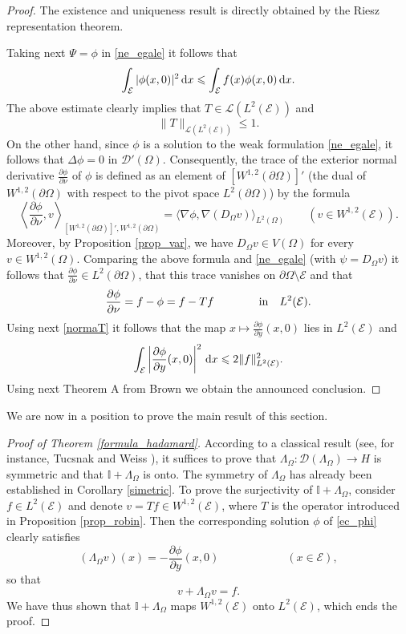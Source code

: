 \documentclass{amsart} %
\numberwithin{equation}{section}
\theoremstyle{definition}
\begin{document}
\begin{proof}
The existence and uniqueness result is directly obtained by the Riesz representation theorem.


Taking next $\Psi=\phi$ in \eqref{ne_egale} it follows that
$$
\int_\mathcal{E} |\phi(x,0)|^2 \, {\rm d} x\leqslant \int_\mathcal{E} f(x) \phi(x,0)\, {\rm d}x. 
$$
The above estimate clearly implies that $T\in \mathcal{L}(L^2(\mathcal{E}))$ and 
\begin{equation}\label{normaT}
\|T\|_{\mathcal{L}(L^2(\mathcal{E}))}\leqslant 1.
\end{equation}
On the other hand, since $\phi$ is a solution to the weak formulation \eqref{ne_egale}, it follows that $\Delta\phi=0$ in
$\mathcal{D}'(\Omega)$. Consequently, the   trace of the exterior normal derivative $\frac{\partial\phi}{\partial\nu}$ of $\phi$ is
defined as an element of $\left[W^{1,2}(\partial\Omega)\right]'$ (the dual of
$W^{1,2}(\partial\Omega)$ with respect to the pivot space $L^2(\partial\Omega)$)
by the formula 
$$
\left\langle \frac{\partial\phi}{\partial\nu},v\right\rangle_{\left[W^{1,2}(\partial\Omega)\right]',W^{1,2}(\partial\Omega)}=
\langle\nabla\phi,\nabla(D_\Omega v)\rangle_{L^2(\Omega)} \qquad(v\in W^{1,2}(\mathcal{E})).
$$
Moreover, by Proposition \ref{prop_var}, we have $D_\Omega v\in V(\Omega)$ for every $v\in W^{1,2}(\Omega)$.
Comparing the above formula and \eqref{ne_egale} (with $\psi=D_\Omega v$) it follows that $\frac{\partial\phi}{\partial\nu}\in L^2(\partial\Omega)$, that this trace vanishes on $\partial\Omega\setminus \mathcal{E}$ and that 
$$
\frac{\partial \phi}{\partial \nu}=f-\phi=f -Tf\qquad\qquad {\rm in}\quad L^2(\mathcal{E}).
$$
Using next \eqref{normaT} it follows that the map $x\mapsto \frac{\partial \phi}{\partial y}(x,0)$ lies in $L^2(\mathcal{E})$ and
$$
\int_\mathcal{E} \left| \frac{\partial \phi}{\partial y}(x,0) \right|^2\, {\rm d}x \leqslant
2\|f\|^2_{L^2(\mathcal{E})}.
$$
Using next Theorem A from Brown \cite{brown1994mixed} we obtain the announced conclusion.
\end{proof}

We are now in a position to prove the main result of this section.

\begin{proof}[Proof of Theorem \ref{formula_hadamard}]
According to a classical result (see, for instance, Tucsnak and Weiss \cite[Proposition 2.3.4]{Obs_book}),
it suffices to prove that $\Lambda_\Omega:\mathcal{D}(\Lambda_\Omega)\to H$ is symmetric and that $\mathbb{I}+\Lambda_\Omega$ is onto.
The symmetry of $\Lambda_\Omega$ has already been established in Corollary \ref{simetric}.
To prove the surjectivity of $\mathbb{I}+\Lambda_\Omega$, consider $f\in L^2(\mathcal{E})$
and denote  $v=Tf\in W^{1,2}(\mathcal{E})$, where $T$ is the operator introduced in Proposition \ref{prop_robin}. 
Then the corresponding solution $\phi$ of \eqref{ec_phi} clearly satisfies
$$
(\Lambda_\Omega v)(x)=-\frac{\partial\phi}{\partial y} (x,0) \qquad\qquad\qquad(x\in \mathcal{E}),
$$
 so that
$$
v+\Lambda_\Omega v=f.
$$
We have thus shown that $\mathbb{I}+\Lambda_{\Omega}$ maps $W^{1,2}(\mathcal{E})$ onto $L^2(\mathcal{E})$, which ends the proof.
\end{proof}
\end{document}
